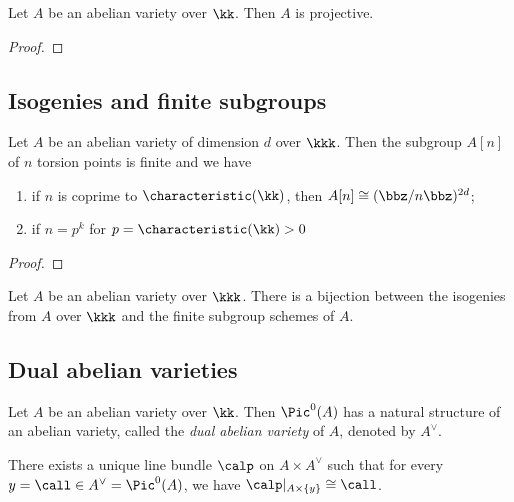     \begin{theorem}\label{thm: abelian varieties are projective}
        Let $A$ be an abelian variety over $\kk$. 
        Then $A$ is projective.
    \end{theorem}
    \begin{proof}
    \end{proof}


\subsection{Isogenies and finite subgroups}

    \begin{theorem}\label{thm: torsion subgroups of abelian varieties}
        Let \(A\) be an abelian variety of dimension \(d\) over \(\kkk\). 
        Then the subgroup \(A[n]\) of \(n\) torsion points is finite and we have 
        \begin{enumerate}
            \item if \(n\) is coprime to \(\characteristic(\kk)\), then \(A[n] \cong (\bbz/n\bbz)^{2d}\);
            \item if \(n = p^k\) for \(p = \characteristic(\kk) > 0\)
        \end{enumerate}
    \end{theorem}
    \begin{proof}
    \end{proof}

    \begin{theorem}\label{thm:isogenies_and_finite_subgroups}
        Let \(A\) be an abelian variety over \(\kkk\). 
        There is a bijection between the isogenies from \(A\) over \(\kkk\) and the finite subgroup schemes of \(A\).
    \end{theorem}


\subsection{Dual abelian varieties}

    \begin{theorem}\label{thm: dual abelian varieties}
        Let $A$ be an abelian variety over $\kk$. 
        Then \(\Pic^0(A) \) has a natural structure of an abelian variety, called the \emph{dual abelian variety} of $A$, denoted by $A^\vee$.
    \end{theorem}

    \begin{proposition}\label{prop: the Poincare line bundle}
        There exists a unique line bundle \(\calp\) on \(A \times A^\vee\) such that for every \(y = \call \in A^\vee = \Pic^0(A)\), we have \(\calp|_{A \times \{y\}} \cong \call\).
    \end{proposition}